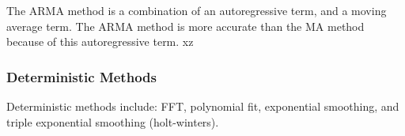 The \gls{ARMA} method is a combination of an autoregressive term, 
and a moving average term. 
The \gls{ARMA} method is more accurate than the MA method 
because of this autoregressive term. xz 

\subsubsection{Deterministic Methods}
Deterministic methods include: \gls{FFT}, polynomial fit, 
exponential smoothing, and triple exponential smoothing 
(holt-winters). 

\subsection{}